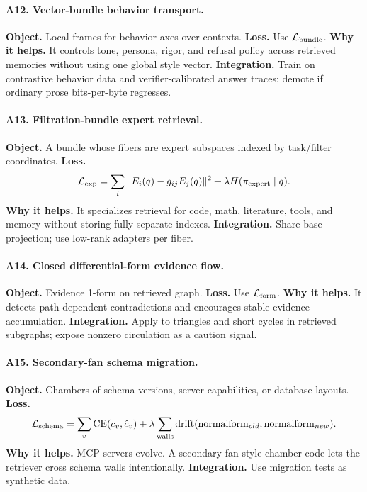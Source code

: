 \documentclass[11pt]{article}
\newcommand{\loss}{\mathcal{L}}
\numberwithin{equation}{section}
\begin{document}
\paragraph{A12. Vector-bundle behavior transport.}
\textbf{Object.} Local frames for behavior axes over contexts. \textbf{Loss.} Use $\loss_{\rm bundle}$. \textbf{Why it helps.} It controls tone, persona, rigor, and refusal policy across retrieved memories without using one global style vector. \textbf{Integration.} Train on contrastive behavior data and verifier-calibrated answer traces; demote if ordinary prose bits-per-byte regresses.

\paragraph{A13. Filtration-bundle expert retrieval.}
\textbf{Object.} A bundle whose fibers are expert subspaces indexed by task/filter coordinates. \textbf{Loss.}
\begin{equation}
\loss_{\rm exp}=\sum_i\|E_i(q)-g_{ij}E_j(q)\|^2+\lambda H(\pi_{\rm expert}\mid q).
\end{equation}
\textbf{Why it helps.} It specializes retrieval for code, math, literature, tools, and memory without storing fully separate indexes. \textbf{Integration.} Share base projection; use low-rank adapters per fiber.

\paragraph{A14. Closed differential-form evidence flow.}
\textbf{Object.} Evidence 1-form on retrieved graph. \textbf{Loss.} Use $\loss_{\rm form}$. \textbf{Why it helps.} It detects path-dependent contradictions and encourages stable evidence accumulation. \textbf{Integration.} Apply to triangles and short cycles in retrieved subgraphs; expose nonzero circulation as a caution signal.

\paragraph{A15. Secondary-fan schema migration.}
\textbf{Object.} Chambers of schema versions, server capabilities, or database layouts. \textbf{Loss.}
\begin{equation}
\loss_{\rm schema}=\sum_{v}\operatorname{CE}(c_v,\hat c_v)+\lambda\sum_{\text{walls}}\operatorname{drift}(\mathrm{normalform}_{old},\mathrm{normalform}_{new}).
\end{equation}
\textbf{Why it helps.} MCP servers evolve. A secondary-fan-style chamber code lets the retriever cross schema walls intentionally. \textbf{Integration.} Use migration tests as synthetic data.
\end{document}
